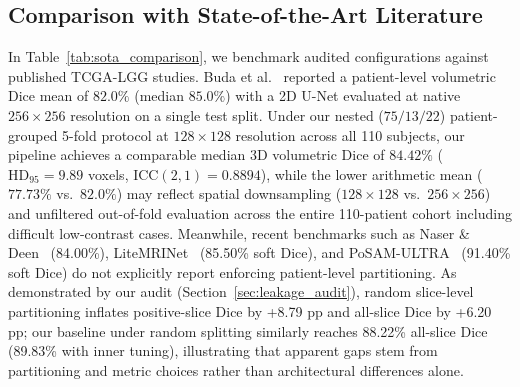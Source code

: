 \documentclass[11pt,a4paper]{article}
\begin{document}
\subsection{Comparison with State-of-the-Art Literature}
\label{sec:sota_comparison}

In Table~\ref{tab:sota_comparison}, we benchmark audited configurations against published TCGA-LGG studies. Buda et al.~\cite{buda2019association} reported a patient-level volumetric Dice mean of $82.0\%$ (median $85.0\%$) with a 2D U-Net evaluated at native $256 \times 256$ resolution on a single test split. Under our nested ($75/13/22$) patient-grouped 5-fold protocol at $128 \times 128$ resolution across all 110 subjects, our pipeline achieves a comparable median 3D volumetric Dice of $84.42\%$ ($\text{HD}_{95} = 9.89$ voxels, $\text{ICC}(2,1) = 0.8894$), while the lower arithmetic mean ($77.73\%$ vs.\ $82.0\%$) may reflect spatial downsampling ($128 \times 128$ vs.\ $256 \times 256$) and unfiltered out-of-fold evaluation across the entire 110-patient cohort including difficult low-contrast cases. Meanwhile, recent benchmarks such as Naser \& Deen~\cite{naser2020brain} (84.00\%), LiteMRINet~\cite{yuan2025enhanced} (85.50\% soft Dice), and PoSAM-ULTRA~\cite{alhatamleh2026attention} (91.40\% soft Dice) do not explicitly report enforcing patient-level partitioning. As demonstrated by our audit (Section~\ref{sec:leakage_audit}), random slice-level partitioning inflates positive-slice Dice by +8.79 pp and all-slice Dice by +6.20 pp; our baseline under random splitting similarly reaches 88.22\% all-slice Dice (89.83\% with inner tuning), illustrating that apparent gaps stem from partitioning and metric choices rather than architectural differences alone.
\end{document}
